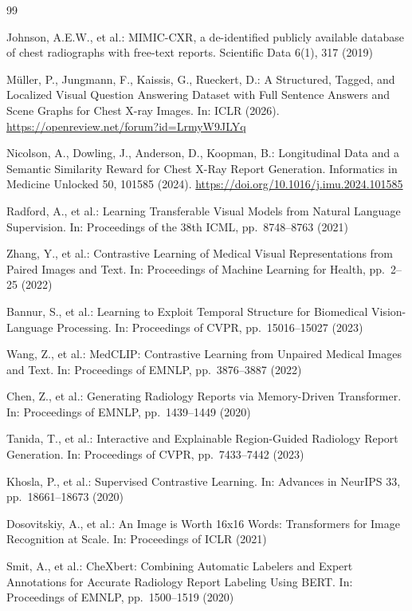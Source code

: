 \documentclass[runningheads]{llncs}
\begin{document}
\begin{thebibliography}{99}

Johnson, A.E.W., et al.: MIMIC-CXR, a de-identified publicly available
database of chest radiographs with free-text reports.
Scientific Data 6(1), 317 (2019)

M\"{u}ller, P., Jungmann, F., Kaissis, G., Rueckert, D.:
A Structured, Tagged, and Localized Visual Question Answering Dataset
with Full Sentence Answers and Scene Graphs for Chest X-ray Images.
In: ICLR (2026). \url{https://openreview.net/forum?id=LrmyW9JLYq}

Nicolson, A., Dowling, J., Anderson, D., Koopman, B.:
Longitudinal Data and a Semantic Similarity Reward for Chest X-Ray
Report Generation.
Informatics in Medicine Unlocked 50, 101585 (2024).
\url{https://doi.org/10.1016/j.imu.2024.101585}

Radford, A., et al.: Learning Transferable Visual Models from Natural
Language Supervision.
In: Proceedings of the 38th ICML, pp.~8748--8763 (2021)

Zhang, Y., et al.: Contrastive Learning of Medical Visual Representations
from Paired Images and Text.
In: Proceedings of Machine Learning for Health, pp.~2--25 (2022)

Bannur, S., et al.: Learning to Exploit Temporal Structure for
Biomedical Vision-Language Processing.
In: Proceedings of CVPR, pp.~15016--15027 (2023)

Wang, Z., et al.: MedCLIP: Contrastive Learning from Unpaired Medical
Images and Text.
In: Proceedings of EMNLP, pp.~3876--3887 (2022)

Chen, Z., et al.: Generating Radiology Reports via Memory-Driven
Transformer.
In: Proceedings of EMNLP, pp.~1439--1449 (2020)

Tanida, T., et al.: Interactive and Explainable Region-Guided Radiology
Report Generation.
In: Proceedings of CVPR, pp.~7433--7442 (2023)

Khosla, P., et al.: Supervised Contrastive Learning.
In: Advances in NeurIPS 33, pp.~18661--18673 (2020)

Dosovitskiy, A., et al.: An Image is Worth 16x16 Words: Transformers
for Image Recognition at Scale.
In: Proceedings of ICLR (2021)

Smit, A., et al.: CheXbert: Combining Automatic Labelers and Expert
Annotations for Accurate Radiology Report Labeling Using BERT.
In: Proceedings of EMNLP, pp.~1500--1519 (2020)


\end{thebibliography}
\end{document}

